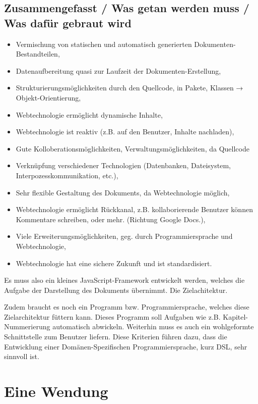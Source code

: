 \subsection{Zusammengefasst / Was getan werden muss / Was dafür gebraut wird}
\begin{itemize}
  \item Vermischung von statischen und automatisch generierten
        Doku\-menten-\-Be\-stand\-teilen,
  \item Datenaufbereitung quasi zur Laufzeit der Doku\-menten-\-Er\-stell\-ung,
  \item Strukturierungsmöglichkeiten durch den Quellcode, in Pakete, Klassen
        → Objekt-Orientierung,
  \item Webtechnologie ermöglicht dynamische Inhalte,
  \item Webtechnologie ist reaktiv (z.B. auf den Benutzer, Inhalte nachladen),
  \item Gute Kolloberationsmöglichkeiten, Verwaltungsmöglichkeiten,
        da Quellcode
  \item Verknüpfung verschiedener Technologien (Datenbanken, Dateisystem,
        Interpozesskommunikation, etc.),
  \item Sehr flexible Gestaltung des Dokuments, da Webtechnologie möglich,
  \item Webtechnologie ermöglicht Rückkanal, z.B. kollaborierende Benutzer
        können Kommentare schreiben, oder mehr. (Richtung Google Docs.),
  \item Viele Erweiterungsmöglichkeiten, geg. durch Programmiersprache und
        Webtechnologie,
  \item Webtechnologie hat eine sichere Zukunft und ist standardisiert.
\end{itemize}

Es muss also ein kleines JavaScript-Framework entwickelt werden, welches die
Aufgabe der Darstellung des Dokuments übernimmt. Die Zielachitektur.

Zudem braucht es noch ein Programm bzw. Programmiersprache, welches diese
Zielarchitektur füttern kann. Dieses Programm soll Aufgaben wie z.B.
Kapitel-Nummerierung automatisch abwickeln. Weiterhin muss es auch ein
wohlgeformte Schnittstelle zum Benutzer liefern. Diese Kriterien führen
dazu, dass die Entwicklung einer Domänen-Spezifischen Programmiersprache,
kurz DSL, sehr sinnvoll ist.

\section{Eine Wendung}

